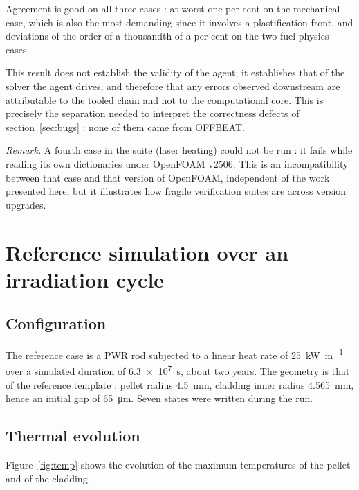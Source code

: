 Agreement is good on all three cases : at worst one per cent on the mechanical
case, which is also the most demanding since it involves a plastification front,
and deviations of the order of a thousandth of a per cent on the two fuel
physics cases.

This result does not establish the validity of the agent; it establishes that
of the solver the agent drives, and therefore that any errors observed
downstream are attributable to the tooled chain and not to the computational
core. This is precisely the separation needed to interpret the correctness
defects of section~\ref{sec:bugs} : none of them came from OFFBEAT.

\vspace{0.2cm}
\noindent
\textit{Remark.} A fourth case in the suite (laser heating) could not be run : it
fails while reading its own dictionaries under OpenFOAM v2506. This is an
incompatibility between that case and that version of OpenFOAM, independent of
the work presented here, but it illustrates how fragile verification suites are
across version upgrades.

\section{Reference simulation over an irradiation cycle}

\subsection{Configuration}

The reference case is a PWR rod subjected to a linear heat rate of
\SI{25}{\kilo\watt\per\metre} over a simulated duration of \SI{6.3e7}{\second},
about two years. The geometry is that of the reference template : pellet radius
\SI{4.5}{\milli\metre}, cladding inner radius \SI{4.565}{\milli\metre}, hence an
initial gap of \SI{65}{\micro\metre}. Seven states were written during the run.

\subsection{Thermal evolution}

Figure~\ref{fig:temp} shows the evolution of the maximum temperatures of the
pellet and of the cladding.

